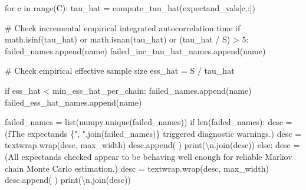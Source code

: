 \documentclass[
  letterpaper,
  DIV=11,
  numbers=noendperiod]{scrartcl}
\newenvironment{Shaded}{\begin{snugshade}}{\end{snugshade}}
\newcommand{\BuiltInTok}[1]{\textcolor[rgb]{0.00,0.23,0.31}{#1}}
\newcommand{\CharTok}[1]{\textcolor[rgb]{0.13,0.47,0.30}{#1}}
\newcommand{\CommentTok}[1]{\textcolor[rgb]{0.37,0.37,0.37}{#1}}
\newcommand{\ControlFlowTok}[1]{\textcolor[rgb]{0.00,0.23,0.31}{#1}}
\newcommand{\DecValTok}[1]{\textcolor[rgb]{0.68,0.00,0.00}{#1}}
\newcommand{\KeywordTok}[1]{\textcolor[rgb]{0.00,0.23,0.31}{#1}}
\newcommand{\NormalTok}[1]{\textcolor[rgb]{0.00,0.23,0.31}{#1}}
\newcommand{\OperatorTok}[1]{\textcolor[rgb]{0.37,0.37,0.37}{#1}}
\newcommand{\SpecialCharTok}[1]{\textcolor[rgb]{0.37,0.37,0.37}{#1}}
\newcommand{\SpecialStringTok}[1]{\textcolor[rgb]{0.13,0.47,0.30}{#1}}
\newcommand{\StringTok}[1]{\textcolor[rgb]{0.13,0.47,0.30}{#1}}
\begin{document}
\begin{Shaded}
\begin{Highlighting}[]
    \ControlFlowTok{for}\NormalTok{ c }\KeywordTok{in} \BuiltInTok{range}\NormalTok{(C):}
\NormalTok{      tau\_hat }\OperatorTok{=}\NormalTok{ compute\_tau\_hat(expectand\_vals[c,:])}

      \CommentTok{\# Check incremental empirical integrated autocorrelation time}
      \ControlFlowTok{if}\NormalTok{ math.isinf(tau\_hat) }\KeywordTok{or}\NormalTok{ math.isnan(tau\_hat) }\KeywordTok{or}\NormalTok{ (tau\_hat }\OperatorTok{/}\NormalTok{ S) }\OperatorTok{\textgreater{}} \DecValTok{5}\NormalTok{:}
\NormalTok{        failed\_names.append(name)}
\NormalTok{        failed\_inc\_tau\_hat\_names.append(name)}

      \CommentTok{\# Check empirical effective sample size}
\NormalTok{      ess\_hat }\OperatorTok{=}\NormalTok{ S }\OperatorTok{/}\NormalTok{ tau\_hat}

      \ControlFlowTok{if}\NormalTok{ ess\_hat }\OperatorTok{\textless{}}\NormalTok{ min\_ess\_hat\_per\_chain:}
\NormalTok{        failed\_names.append(name)}
\NormalTok{        failed\_ess\_hat\_names.append(name)}

\NormalTok{  failed\_names }\OperatorTok{=} \BuiltInTok{list}\NormalTok{(numpy.unique(failed\_names))}
  \ControlFlowTok{if} \BuiltInTok{len}\NormalTok{(failed\_names):}
\NormalTok{    desc }\OperatorTok{=}\NormalTok{ (}\SpecialStringTok{f\textquotesingle{}The expectands }\SpecialCharTok{\{}\StringTok{", "}\SpecialCharTok{.}\NormalTok{join(failed\_names)}\SpecialCharTok{\}}\SpecialStringTok{ \textquotesingle{}}
             \StringTok{\textquotesingle{}triggered diagnostic warnings.\textquotesingle{}}\NormalTok{)}
\NormalTok{    desc }\OperatorTok{=}\NormalTok{ textwrap.wrap(desc, max\_width)}
\NormalTok{    desc.append(}\StringTok{\textquotesingle{} \textquotesingle{}}\NormalTok{)}
    \BuiltInTok{print}\NormalTok{(}\StringTok{\textquotesingle{}}\CharTok{\textbackslash{}n}\StringTok{\textquotesingle{}}\NormalTok{.join(desc))}
  \ControlFlowTok{else}\NormalTok{:}
\NormalTok{    desc }\OperatorTok{=}\NormalTok{ (}\StringTok{\textquotesingle{}All expectands checked appear to be behaving well enough \textquotesingle{}}
            \StringTok{\textquotesingle{}for reliable Markov chain Monte Carlo estimation.\textquotesingle{}}\NormalTok{)}
\NormalTok{    desc }\OperatorTok{=}\NormalTok{ textwrap.wrap(desc, max\_width)}
\NormalTok{    desc.append(}\StringTok{\textquotesingle{} \textquotesingle{}}\NormalTok{)}
    \BuiltInTok{print}\NormalTok{(}\StringTok{\textquotesingle{}}\CharTok{\textbackslash{}n}\StringTok{\textquotesingle{}}\NormalTok{.join(desc))}


\end{Highlighting}
\end{Shaded}
\end{document}
